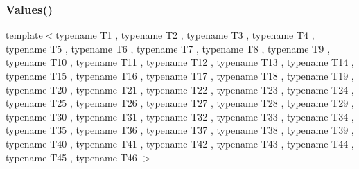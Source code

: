 \mbox{\label{namespacetesting_a8f5536906a9d6780467c8ae53a420dad}} 
\subsubsection{\texorpdfstring{Values()}{Values()}\hspace{0.1cm}{\footnotesize\ttfamily [46/50]}}
{\footnotesize\ttfamily template$<$typename T1 , typename T2 , typename T3 , typename T4 , typename T5 , typename T6 , typename T7 , typename T8 , typename T9 , typename T10 , typename T11 , typename T12 , typename T13 , typename T14 , typename T15 , typename T16 , typename T17 , typename T18 , typename T19 , typename T20 , typename T21 , typename T22 , typename T23 , typename T24 , typename T25 , typename T26 , typename T27 , typename T28 , typename T29 , typename T30 , typename T31 , typename T32 , typename T33 , typename T34 , typename T35 , typename T36 , typename T37 , typename T38 , typename T39 , typename T40 , typename T41 , typename T42 , typename T43 , typename T44 , typename T45 , typename T46 $>$ \\
}
